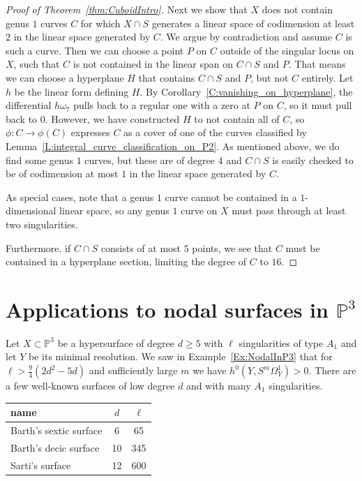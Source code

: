 \documentclass[12pt, reqno]{amsart}
\theoremstyle{definition}
\newcommand{\PP}{{\mathbb P}}
\numberwithin{equation}{section}
\numberwithin{table}{section}
\begin{document}
\begin{proof}[Proof of Theorem~\ref{thm:CuboidIntro}]
Next we show that $X$ does not contain genus $1$ curves $C$ for which $X\cap S$ generates a linear space of codimension at least $2$ in the linear space generated by $C$. We argue by contradiction and assume $C$ is such a curve. Then we can choose a point $P$ on $C$ outside of the singular locus on $X$, such that $C$ is not contained in the linear span on $C\cap S$ and $P$. That means we can choose a hyperplane $H$ that contains $C\cap S$ and $P$, but not $C$ entirely. Let $h$ be the linear form defining $H$. By Corollary~\ref{C:vanishing_on_hyperplane}, the differential $h\omega_7$ pulls back to a regular one with a zero at $P$ on $C$, so it must pull back to $0$. However, we have constructed $H$ to not contain all of $C$, so $\phi\colon C\to \phi(C)$ expresses $C$ as a cover of one of the curves classified by Lemma~\ref{L:integral_curve_classification_on_P2}. As mentioned above, we do find some genus $1$ curves, but these are of degree $4$ and $C\cap S$ is easily checked to be of codimension at most $1$ in the linear space generated by $C$.

As special cases, note that a genus $1$ curve cannot be contained in a $1$-dimensional linear space, so any genus $1$ curve on $X$ must pass through at least two singularities.

Furthermore. if $C\cap S$ consists of at most $5$ points, we see that $C$ must be contained in a hyperplane section, limiting the degree of $C$ to $16$.
\end{proof}


\section{Applications to nodal surfaces in $\PP^3$}
\label{s:nodalsurfaces}

Let $X\subset \PP^3$ be a hypersurface of degree $d\geq 5$ with $\ell$ singularities of type $A_1$ and let $Y$ be its minimal resolution. We saw in Example~\ref{Ex:NodalInP3} that for $\ell>\frac{9}{4}(2d^2-5d)$ and sufficiently large $m$ we have $h^0(Y,S^m\Omega^1_Y) >0$. There are a few well-known surfaces of low degree $d$ and with many $A_1$ singularities.

\begin{center}
\begin{tabular}{l|c|c}
	name&$d$&$\ell$\\
	\hline
	Barth's sextic surface \cite{Barth1996}&6&65\\
	Barth's decic surface \cite{Barth1996}&10&345\\
	Sarti's surface \cite{Sarti2001}&12&600
\end{tabular}
\end{center}
\end{document}
